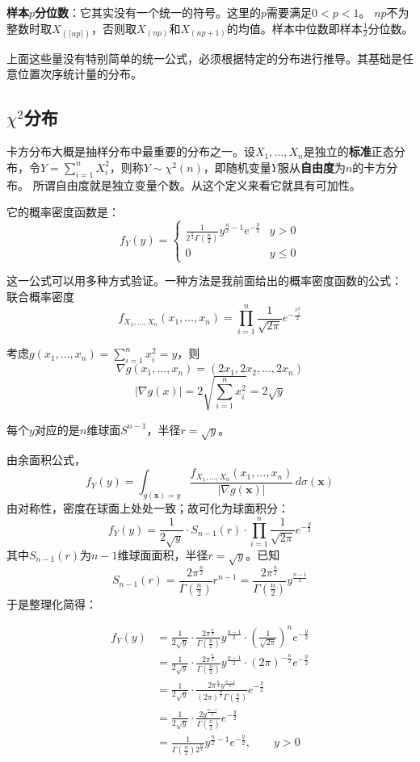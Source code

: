 \textbf{样本$p$分位数}：它其实没有一个统一的符号。这里的$p$需要满足$0<p<1$。
$np$不为整数时取$X_{(\lceil np\rceil)}$，否则取$X_{(np)}$和$X_{(np+1)}$的均值。样本中位数即样本$\frac 12$分位数。

上面这些量没有特别简单的统一公式，必须根据特定的分布进行推导。其基础是任意位置次序统计量的分布。

\subsection{$\chi^2$分布}
卡方分布大概是抽样分布中最重要的分布之一。设$X_1,\ldots,X_n$是独立的\textbf{标准}正态分布，令$Y=\sum_{i=1}^nX_i^2$，则称$Y\sim \chi^2(n)$，即随机变量$Y$服从\textbf{自由度}为$n$的卡方分布。
所谓自由度就是独立变量个数。从这个定义来看它就具有可加性。

它的概率密度函数是：
\[
f_Y(y) = \begin{cases}
    \frac{1}{2^{\frac n2}\Gamma(\frac n2)}y^{\frac n2 -1}e^{-\frac y2} & y>0\\
    0 & y \leq 0
\end{cases}
\]

这一公式可以用多种方式验证。一种方法是我前面给出的概率密度函数的公式：
联合概率密度
\[
f_{X_1,\ldots,X_n}(x_1,\ldots,x_n) = \prod_{i=1}^n \frac{1}{\sqrt{2\pi}} e^{-\frac{x_i^2}{2}}
\]

考虑$g(x_1, \ldots, x_n) = \sum_{i=1}^n x_i^2 = y$，则
\[
\nabla g(x_1,\ldots,x_n) = (2x_1, 2x_2, \ldots, 2x_n)
\]
\[
|\nabla g(x)| = 2 \sqrt{\sum_{i=1}^n x_i^2} = 2 \sqrt{y}
\]

每个$y$对应的是$n$维球面$S^{n-1}$，半径$r = \sqrt{y}$。

由余面积公式，
\[
f_Y(y) = \int_{g(\mathbf{x}) = y} \frac{f_{X_1,\ldots,X_n}(x_1,\ldots,x_n)}{|\nabla g(\mathbf{x})|}\, d\sigma(\mathbf{x})
\]
由对称性，密度在球面上处处一致；故可化为球面积分：
\[
f_Y(y) = \frac{1}{2 \sqrt{y}} \cdot S_{n-1}(r) \cdot \prod_{i=1}^n \frac{1}{\sqrt{2\pi}} e^{-\frac{y}{2}}
\]
其中$S_{n-1}(r)$为$n-1$维球面面积，半径$r = \sqrt{y}$。已知
\[
S_{n-1}(r) = \frac{2 \pi^{\frac{n}{2}}}{\Gamma(\frac{n}{2})} r^{n-1} = \frac{2 \pi^{\frac{n}{2}}}{\Gamma(\frac{n}{2})} y^{\frac{n-1}{2}}
\]
于是整理化简得：

\begin{align*}
f_Y(y) &= \frac{1}{2 \sqrt{y}} \cdot \frac{2 \pi^{\frac{n}{2}}}{\Gamma\left(\frac{n}{2}\right)} y^{\frac{n-1}{2}} \cdot \left( \frac{1}{\sqrt{2\pi}} \right)^n e^{-\frac{y}{2}} \\
&= \frac{1}{2 \sqrt{y}} \cdot \frac{2 \pi^{\frac{n}{2}}}{\Gamma\left(\frac{n}{2}\right)} y^{\frac{n-1}{2}} \cdot (2\pi)^{-\frac{n}{2}} e^{-\frac{y}{2}} \\
&= \frac{1}{2 \sqrt{y}} \cdot \frac{2 \pi^{\frac{n}{2}} y^{\frac{n-1}{2}}}{(2\pi)^{\frac{n}{2}} \Gamma\left(\frac{n}{2}\right)} e^{-\frac{y}{2}} \\
&= \frac{1}{2 \sqrt{y}} \cdot \frac{2 y^{\frac{n-1}{2}}}{\Gamma\left(\frac{n}{2}\right)} e^{-\frac{y}{2}} \\
&= \frac{1}{\Gamma\left(\frac{n}{2}\right) 2^{\frac{n}{2}}} y^{\frac{n}{2}-1} e^{-\frac{y}{2}}, \qquad y > 0
\end{align*}

